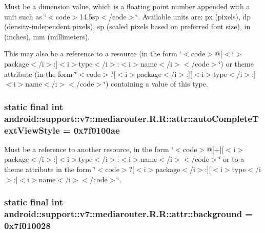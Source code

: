Must be a dimension value, which is a floating point number appended with a unit such as \char`\"{}$<$code$>$14.5sp$<$/code$>$\char`\"{}. Available units are: px (pixels), dp (density-independent pixels), sp (scaled pixels based on preferred font size), in (inches), mm (millimeters). 

This may also be a reference to a resource (in the form \char`\"{}$<$code$>$@\mbox{[}$<$i$>$package$<$/i$>$:\mbox{]}$<$i$>$type$<$/i$>$:$<$i$>$name$<$/i$>$$<$/code$>$\char`\"{}) or theme attribute (in the form \char`\"{}$<$code$>$?\mbox{[}$<$i$>$package$<$/i$>$:\mbox{]}\mbox{[}$<$i$>$type$<$/i$>$:\mbox{]}$<$i$>$name$<$/i$>$$<$/code$>$\char`\"{}) containing a value of this type. \hypertarget{classandroid_1_1support_1_1v7_1_1mediarouter_1_1_r_1_1attr_0a1364db52561af1198856c974a384d0}{
\subsubsection[{autoCompleteTextViewStyle}]{\setlength{\rightskip}{0pt plus 5cm}static final int android::support::v7::mediarouter.R.R::attr::autoCompleteTextViewStyle = 0x7f0100ae}}
\label{classandroid_1_1support_1_1v7_1_1mediarouter_1_1_r_1_1attr_0a1364db52561af1198856c974a384d0}


Must be a reference to another resource, in the form \char`\"{}$<$code$>$@\mbox{[}+\mbox{]}\mbox{[}$<$i$>$package$<$/i$>$:\mbox{]}$<$i$>$type$<$/i$>$:$<$i$>$name$<$/i$>$$<$/code$>$\char`\"{} or to a theme attribute in the form \char`\"{}$<$code$>$?\mbox{[}$<$i$>$package$<$/i$>$:\mbox{]}\mbox{[}$<$i$>$type$<$/i$>$:\mbox{]}$<$i$>$name$<$/i$>$$<$/code$>$\char`\"{}. \hypertarget{classandroid_1_1support_1_1v7_1_1mediarouter_1_1_r_1_1attr_c671a1eddbc8f9c1e177a19873f717e5}{
\subsubsection[{background}]{\setlength{\rightskip}{0pt plus 5cm}static final int android::support::v7::mediarouter.R.R::attr::background = 0x7f010028}}
\label{classandroid_1_1support_1_1v7_1_1mediarouter_1_1_r_1_1attr_c671a1eddbc8f9c1e177a19873f717e5}


